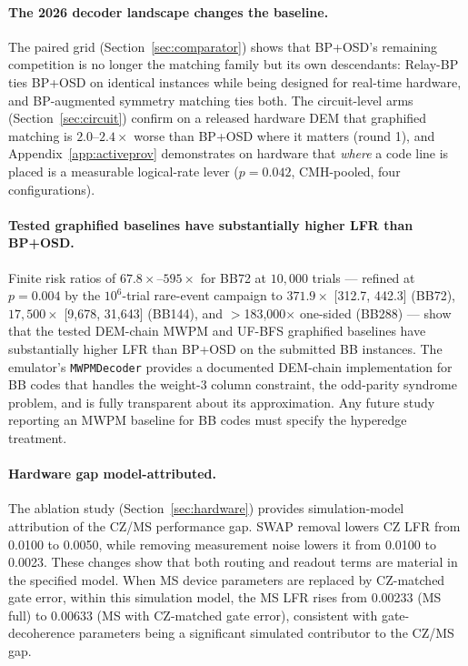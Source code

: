 \documentclass[11pt,a4paper]{article}
\begin{document}
\paragraph{The 2026 decoder landscape changes the baseline.}
The paired grid (Section~\ref{sec:comparator}) shows that BP+OSD's remaining
competition is no longer the matching family but its own descendants:
Relay-BP ties BP+OSD on identical instances while being designed for
real-time hardware, and BP-augmented symmetry matching ties both. The
circuit-level arms (Section~\ref{sec:circuit}) confirm on a released
hardware DEM that graphified matching is $2.0$--$2.4\times$ worse than
BP+OSD where it matters (round 1), and Appendix~\ref{app:activeprov}
demonstrates on hardware that \emph{where} a code line is placed is a
measurable logical-rate lever ($p=0.042$, CMH-pooled, four configurations).

\paragraph{Tested graphified baselines have substantially higher LFR than BP+OSD.}
Finite risk ratios of $67.8\times$--$595\times$ for BB72 at $10{,}000$
trials --- refined at $p=0.004$ by the $10^{6}$-trial rare-event campaign
to $371.9\times$ [312.7, 442.3] (BB72), $17{,}500\times$ [9{,}678,
31{,}643] (BB144), and $>$183{,}000$\times$ one-sided (BB288) --- show that the tested DEM-chain MWPM and UF-BFS graphified baselines have substantially higher LFR than BP+OSD on the submitted BB instances.
The emulator's \texttt{MWPMDecoder} provides a documented DEM-chain implementation for BB codes that handles the weight-3 column constraint, the odd-parity syndrome problem, and is fully transparent
about its approximation.
Any future study reporting an MWPM baseline for BB codes must specify
the hyperedge treatment.

\paragraph{Hardware gap model-attributed.}
The ablation study (Section~\ref{sec:hardware}) provides simulation-model attribution of the CZ/MS performance gap.
SWAP removal lowers CZ LFR from 0.0100 to 0.0050, while removing measurement noise lowers it from 0.0100 to 0.0023.
These changes show that both routing and readout terms are material in the specified model.
When MS device parameters are replaced by CZ-matched gate error,
within this simulation model, the MS LFR rises from 0.00233 (MS full) to 0.00633
(MS with CZ-matched gate error), consistent with gate-decoherence parameters
being a significant simulated contributor to the CZ/MS gap.
\end{document}
